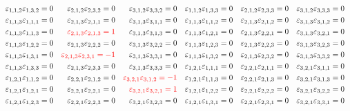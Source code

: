 \documentclass[12pt]{article}
\begin{document}
\begin{equation}
\begin{aligned}
&&\varepsilon_{1,1,2}\varepsilon_{1,3,2}=0&&\varepsilon_{2,1,2}\varepsilon_{2,3,2}=0&&\varepsilon_{3,1,2}\varepsilon_{3,3,2}=0&&\varepsilon_{1,1,2}\varepsilon_{1,3,3}=0&&\varepsilon_{2,1,2}\varepsilon_{2,3,3}=0&&\varepsilon_{3,1,2}\varepsilon_{3,3,3}=0\\
&&\varepsilon_{1,1,3}\varepsilon_{1,1,1}=0&&\varepsilon_{2,1,3}\varepsilon_{2,1,1}=0&&\varepsilon_{3,1,3}\varepsilon_{3,1,1}=0&&\varepsilon_{1,1,3}\varepsilon_{1,1,2}=0&&\varepsilon_{2,1,3}\varepsilon_{2,1,2}=0&&\varepsilon_{3,1,3}\varepsilon_{3,1,2}=0\\
&&\varepsilon_{1,1,3}\varepsilon_{1,1,3}=0&&{\color{red}\varepsilon_{2,1,3}\varepsilon_{2,1,3}=1}
&&\varepsilon_{3,1,3}\varepsilon_{3,1,3}=0&&\varepsilon_{1,1,3}\varepsilon_{1,2,1}=0&&\varepsilon_{2,1,3}\varepsilon_{2,2,1}=0&&\varepsilon_{3,1,3}\varepsilon_{3,2,1}=0\\
&&\varepsilon_{1,1,3}\varepsilon_{1,2,2}=0&&\varepsilon_{2,1,3}\varepsilon_{2,2,2}=0&&\varepsilon_{3,1,3}\varepsilon_{3,2,2}=0&&\varepsilon_{1,1,3}\varepsilon_{1,2,3}=0&&\varepsilon_{2,1,3}\varepsilon_{2,2,3}=0&&\varepsilon_{3,1,3}\varepsilon_{3,2,3}=0\\
&&\varepsilon_{1,1,3}\varepsilon_{1,3,1}=0&&{\color{red}\varepsilon_{2,1,3}\varepsilon_{2,3,1}=-1}
&&\varepsilon_{3,1,3}\varepsilon_{3,3,1}=0&&\varepsilon_{1,1,3}\varepsilon_{1,3,2}=0&&\varepsilon_{2,1,3}\varepsilon_{2,3,2}=0&&\varepsilon_{3,1,3}\varepsilon_{3,3,2}=0\\
&&\varepsilon_{1,1,3}\varepsilon_{1,3,3}=0&&\varepsilon_{2,1,3}\varepsilon_{2,3,3}=0&&\varepsilon_{3,1,3}\varepsilon_{3,3,3}=0&&\varepsilon_{1,2,1}\varepsilon_{1,1,1}=0&&\varepsilon_{2,2,1}\varepsilon_{2,1,1}=0&&\varepsilon_{3,2,1}\varepsilon_{3,1,1}=0\\
&&\varepsilon_{1,2,1}\varepsilon_{1,1,2}=0&&\varepsilon_{2,2,1}\varepsilon_{2,1,2}=0&&{\color{red}\varepsilon_{3,2,1}\varepsilon_{3,1,2}=-1}
&&\varepsilon_{1,2,1}\varepsilon_{1,1,3}=0&&\varepsilon_{2,2,1}\varepsilon_{2,1,3}=0&&\varepsilon_{3,2,1}\varepsilon_{3,1,3}=0\\
&&\varepsilon_{1,2,1}\varepsilon_{1,2,1}=0&&\varepsilon_{2,2,1}\varepsilon_{2,2,1}=0&&{\color{red}\varepsilon_{3,2,1}\varepsilon_{3,2,1}=1}
&&\varepsilon_{1,2,1}\varepsilon_{1,2,2}=0&&\varepsilon_{2,2,1}\varepsilon_{2,2,2}=0&&\varepsilon_{3,2,1}\varepsilon_{3,2,2}=0\\
&&\varepsilon_{1,2,1}\varepsilon_{1,2,3}=0&&\varepsilon_{2,2,1}\varepsilon_{2,2,3}=0&&\varepsilon_{3,2,1}\varepsilon_{3,2,3}=0&&\varepsilon_{1,2,1}\varepsilon_{1,3,1}=0&&\varepsilon_{2,2,1}\varepsilon_{2,3,1}=0&&\varepsilon_{3,2,1}\varepsilon_{3,3,1}=0\\

\end{aligned}
\end{equation}
\end{document}
